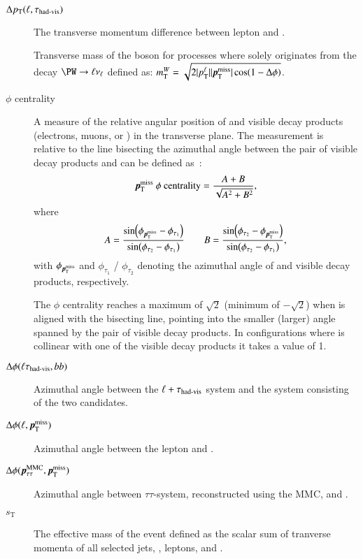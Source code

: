 \begin{description}

\item[$\Delta p_{\text{T}}(\ell, \tau_{\text{had-vis}})$] The transverse momentum
  difference between lepton and \tauhadvis.

\item[\mTW] Transverse mass of the \PW boson for processes where
  \pTmiss solely originates from the decay $\PW \ra \ell \nu_\ell$ defined as:
  $\mTW = \sqrt{2 |\pT^{\ell}| |\pTmiss| \cos(1 - \Delta\phi)}$.

\item[\pTmiss $\phi$ centrality] A measure of the relative angular
  position of \pTmiss and visible \taulepton decay products
  (electrons, muons, or \tauhadvis) in the transverse plane. The
  measurement is relative to the line bisecting the azimuthal angle
  between the pair of visible \taulepton decay products and can be
  defined as~\cite{HIGG-2013-32, HIGG-2016-16-witherratum}:
  \begin{align*}
    \pTmiss\text{ }\phi\text{ centrality} = \frac{A + B}{\sqrt{A^2 + B^2}} \text{,}
  \end{align*}
  where
  \begin{align*}
    A = \frac{\sin(\phi_{\pTmiss} - \phi_{\tau_1})}{\sin(\phi_{\tau_2} - \phi_{\tau_1})} \qquad B = \frac{\sin(\phi_{\tau_2} - \phi_{\pTmiss})}{\sin(\phi_{\tau_2} - \phi_{\tau_1})} \text{,}
  \end{align*}
  with $\phi_{\pTmiss}$ and $\phi_{\tau_1}$ / $\phi_{\tau_2}$ denoting
  the azimuthal angle of \pTmiss and visible \taulepton decay
  products, respectively.

  The \pTmiss $\phi$ centrality reaches a maximum of $\sqrt{2}$
  (minimum of $-\sqrt{2}$) when \pTmiss is aligned with the bisecting
  line, pointing into the smaller (larger) angle spanned by the pair
  of visible \taulepton decay products. In configurations where
  \pTmiss is collinear with one of the visible \taulepton decay
  products it takes a value of 1.

\item[$\Delta\phi(\ell\tau_{\text{had-vis}}, bb)$] Azimuthal angle between the
  $\ell + \tau_{\text{had-vis}}$ system and the system consisting of the two
  \bjet candidates.

\item[$\Delta\phi(\ell, \pTmiss)$] Azimuthal angle between the lepton
  and \pTmiss.

\item[$\Delta\phi(\pTauTau, \pTmiss)$] Azimuthal angle between
  $\tau\tau$-system, reconstructed using the MMC, and \pTmiss.

\item[$s_{\text{T}}$] The effective mass of the event defined as the
  scalar sum of tranverse momenta of all selected jets, \tauhadvis,
  leptons, and \pTmissAbs.
\end{description}

